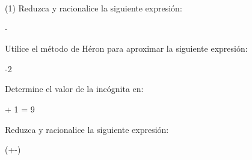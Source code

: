 \documentclass[]{srs}
\begin{document}
\begin{preguntas}(1)
  \pregunta Reduzca y racionalice la siguiente expresión:
  \begin{mcaja}
     -\,
  \end{mcaja}
  \begin{malla}[height=8cm]
  \end{malla}
  \pregunta Utilice el método de Héron para aproximar la siguiente expresión:
  \begin{mcaja}[]
   -2
  \end{mcaja}
  \begin{malla}[height=9cm]
  \end{malla}
  \pregunta Determine el valor de la incógnita en:
  \begin{mcaja}
     + 1 = 9
  \end{mcaja}
  \begin{malla}[height=13cm]
  \end{malla}
  \pregunta Reduzca y racionalice la siguiente expresión:
  \begin{mcaja}
    \left(+-\right)\div{}
  \end{mcaja}
  \begin{malla}[height=20cm]
  \end{malla}
\end{preguntas}
\end{document}
